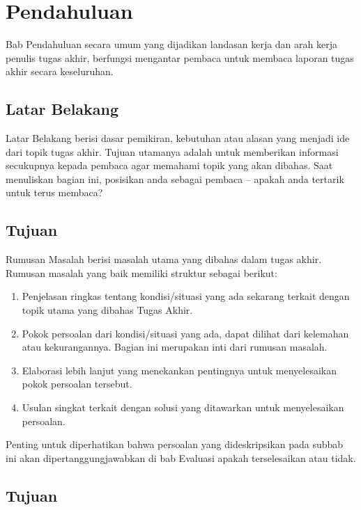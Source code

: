 \chapter{Pendahuluan}
\setcounter{page}{1}

\pagestyle{plain}

Bab Pendahuluan secara umum yang dijadikan landasan kerja dan arah kerja penulis tugas akhir, berfungsi mengantar pembaca untuk membaca laporan tugas akhir secara keseluruhan.

\section{Latar Belakang}

Latar Belakang berisi dasar pemikiran, kebutuhan atau alasan yang menjadi ide dari topik tugas akhir. Tujuan utamanya adalah untuk memberikan informasi secukupnya kepada pembaca agar memahami topik yang akan dibahas.  Saat menuliskan bagian ini, posisikan anda sebagai pembaca – apakah anda tertarik untuk terus membaca?

\section{Tujuan}

Rumusan Masalah berisi masalah utama yang dibahas dalam tugas akhir. Rumusan masalah yang baik memiliki struktur sebagai berikut:

\begin{enumerate}
    \item Penjelasan ringkas tentang kondisi/situasi yang ada sekarang terkait dengan topik utama yang dibahas Tugas Akhir.
    \item Pokok persoalan dari kondisi/situasi yang ada, dapat dilihat dari kelemahan atau kekurangannya. Bagian ini merupakan inti dari rumusan masalah.
    \item Elaborasi lebih lanjut yang menekankan pentingnya untuk menyelesaikan pokok persoalan tersebut.
    \item Usulan singkat terkait dengan solusi yang ditawarkan untuk menyelesaikan persoalan.
\end{enumerate}

Penting untuk diperhatikan bahwa persoalan yang dideskripsikan pada subbab ini akan dipertanggungjawabkan di bab Evaluasi apakah terselesaikan atau tidak.

\section{Tujuan}

